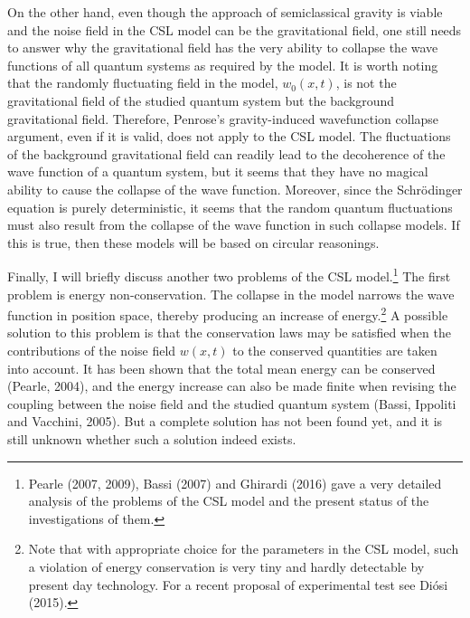 On the other hand, even though the approach of semiclassical gravity is viable and the noise field in the CSL model can be the gravitational field, one still needs to answer why the gravitational field has the very ability to collapse the wave functions of all quantum systems as required by the model. It is worth noting that the randomly fluctuating field in the model, $w_0(x, t)$, is not the gravitational field of the studied quantum system but the background gravitational field. Therefore, Penrose's gravity-induced wavefunction collapse argument, even if it is valid, does not apply to the CSL model. The fluctuations of the background gravitational field can readily lead to the decoherence of the wave function of a quantum system, but it seems that they have no magical ability to cause the collapse of the wave function.
Moreover, since the Schr\"{o}dinger equation is purely deterministic, it seems that the random quantum fluctuations must also result from the collapse of the wave function in such collapse models. If this is true, then these models will be based on circular reasonings.

Finally, I will briefly discuss another two problems of the CSL model.\footnote{Pearle (2007, 2009), Bassi (2007) and Ghirardi (2016) gave a very detailed analysis of the problems of the CSL model and the present status of the investigations of them.} The first problem is energy non-conservation. The collapse in the model narrows the wave function in position space, thereby producing an increase of energy.\footnote{Note that with appropriate choice for the parameters in the CSL model, such a violation of energy conservation is very tiny and hardly detectable by present day technology. For a recent proposal of experimental test see Di\'{o}si (2015).} A possible solution to this problem is that the conservation laws may be satisfied when the contributions of the noise field $w(x, t)$ to the conserved quantities are taken into account. It has been shown that the total mean energy can be conserved (Pearle, 2004), and the energy increase can also be made finite when revising the coupling between the noise field and the studied quantum system (Bassi, Ippoliti and Vacchini, 2005). But a complete solution has not been found yet, and it is still unknown whether such a solution indeed exists.

